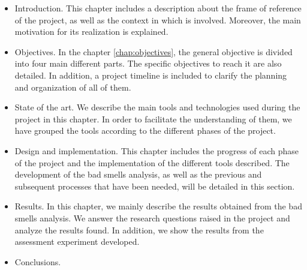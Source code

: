 \begin{itemize}
  \item Introduction. This chapter includes a description about the frame of reference of the project, as well as the context in which is involved. Moreover, the main motivation for its realization is explained.
  
  \item Objectives. In the chapter \ref{chap:objectives}, the general objective is divided into four main different parts. The specific objectives to reach it are also detailed. In addition, a project timeline is included to clarify the planning and organization of all of them.
  
  \item State of the art. We describe the main tools and technologies used during the project in this chapter. In order to facilitate the understanding of them, we have grouped the tools according to the different phases of the project.
  
  \item Design and implementation. This chapter includes the progress of each phase of the project and the implementation of the different tools described. The development of the bad smells analysis, as well as the previous and subsequent processes that have been needed, will be detailed in this section. 
  
  \item Results. In this chapter, we mainly describe the results obtained from the bad smells analysis. We answer the research questions raised in the project and analyze the results found. In addition, we show the results from the assessment experiment developed.
  
  \item Conclusions.
  
\end{itemize}


